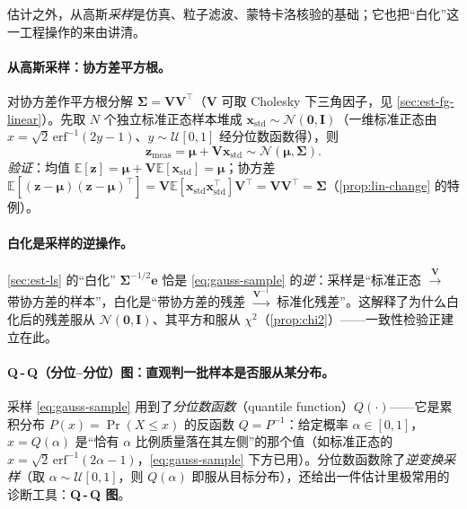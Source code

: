 估计之外，从高斯\emph{采样}是仿真、粒子滤波、蒙特卡洛核验的基础；它也把“白化”这一工程操作的来由讲清。

\paragraph{从高斯采样：协方差平方根。}
对协方差作平方根分解 $\boldsymbol{\Sigma}=\mathbf{V}\mathbf{V}^\top$（$\mathbf{V}$ 可取 Cholesky 下三角因子，见 \cref{sec:est-fg-linear}）。先取 $N$ 个独立标准正态样本堆成 $\mathbf{x}_{\text{std}}\sim\mathcal{N}(\mathbf{0},\mathbf{I})$（一维标准正态由 $x=\sqrt{2}\,\mathrm{erf}^{-1}(2y-1)$、$y\sim\mathcal{U}[0,1]$ 经分位数函数得），则
\begin{equation}
  \mathbf{z}_{\text{meas}}=\boldsymbol{\mu}+\mathbf{V}\mathbf{x}_{\text{std}}\sim\mathcal{N}(\boldsymbol{\mu},\boldsymbol{\Sigma}).
  \label{eq:gauss-sample}
\end{equation}
\emph{验证}：均值 $\mathbb{E}[\mathbf{z}]=\boldsymbol{\mu}+\mathbf{V}\mathbb{E}[\mathbf{x}_{\text{std}}]=\boldsymbol{\mu}$；协方差 $\mathbb{E}[(\mathbf{z}-\boldsymbol{\mu})(\mathbf{z}-\boldsymbol{\mu})^\top]=\mathbf{V}\mathbb{E}[\mathbf{x}_{\text{std}}\mathbf{x}_{\text{std}}^\top]\mathbf{V}^\top=\mathbf{V}\mathbf{V}^\top=\boldsymbol{\Sigma}$（\cref{prop:lin-change} 的特例）。

\paragraph{白化是采样的逆操作。}
\cref{sec:est-ls} 的“白化” $\boldsymbol{\Sigma}^{-1/2}\mathbf{e}$ 恰是 \cref{eq:gauss-sample} 的\emph{逆}：采样是“标准正态 $\xrightarrow{\mathbf{V}}$ 带协方差的样本”，白化是“带协方差的残差 $\xrightarrow{\mathbf{V}^{-1}}$ 标准化残差”。这解释了为什么白化后的残差服从 $\mathcal{N}(\mathbf{0},\mathbf{I})$、其平方和服从 $\chi^2$（\cref{prop:chi2}）——一致性检验正建立在此。

\paragraph{Q\,-\,Q（分位–分位）图：直观判一批样本是否服从某分布。}
采样 \cref{eq:gauss-sample} 用到了\emph{分位数函数}（quantile function）$Q(\cdot)$——它是累积分布 $P(x)=\Pr(X\le x)$ 的反函数 $Q=P^{-1}$：给定概率 $\alpha\in[0,1]$，$x=Q(\alpha)$ 是“恰有 $\alpha$ 比例质量落在其左侧”的那个值（如标准正态的 $x=\sqrt{2}\,\mathrm{erf}^{-1}(2\alpha-1)$，\cref{eq:gauss-sample} 下方已用）。分位数函数除了\emph{逆变换采样}（取 $\alpha\sim\mathcal{U}[0,1]$，则 $Q(\alpha)$ 即服从目标分布），还给出一件估计里极常用的诊断工具：\textbf{Q\,-\,Q 图}\cite{barfoot2024state}。

